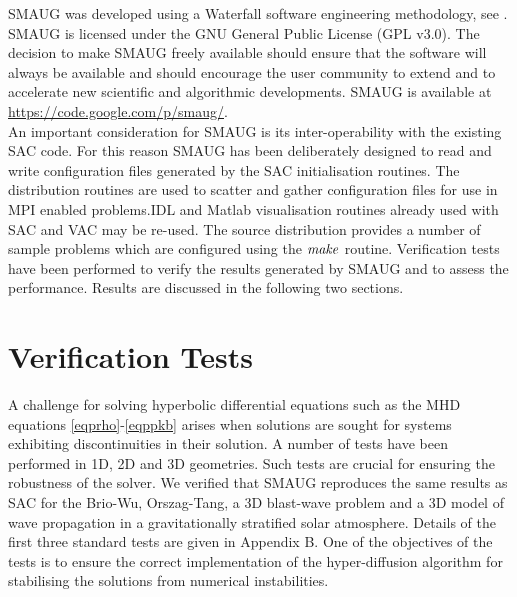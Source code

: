 SMAUG was developed using a Waterfall software engineering methodology, see \citep{Pressman 1997}. SMAUG is licensed under the GNU General Public License (GPL v3.0). The decision to make SMAUG freely available should ensure that the software will always be available and should encourage the user community to extend  and to accelerate new scientific and algorithmic developments. SMAUG is available at
\\ 
\href{https://code.google.com/p/smaug/}{https://code.google.com/p/smaug/}.
\\






An important consideration for SMAUG is its inter-operability with the existing SAC code. For this reason SMAUG has been deliberately designed to read and write configuration files generated by the SAC initialisation routines. The distribution routines are used to scatter and gather configuration files for use in MPI enabled problems.IDL and Matlab visualisation routines already used with SAC and VAC may be re-used. The source distribution provides a number of sample problems which are configured using the $\it{make}$ routine. Verification tests have been performed to verify the results generated by SMAUG and to assess the performance. Results are discussed in the following two sections.

\section{Verification Tests}

A challenge for solving hyperbolic differential equations such as the MHD equations  \eqref{eqprho}-\eqref{eqppkb}  arises when solutions are sought for systems exhibiting discontinuities in their solution.  A number of tests have been performed in 1D, 2D and 3D geometries. Such tests are crucial for ensuring the robustness of  the solver. We verified that SMAUG reproduces the same results as SAC for the Brio-Wu, Orszag-Tang, a 3D blast-wave problem and a 3D model of wave propagation in a gravitationally stratified solar atmosphere. Details of the first three standard tests are given in Appendix B.
One of the objectives of the tests is to ensure the correct implementation of the hyper-diffusion algorithm for stabilising the solutions from numerical instabilities.

